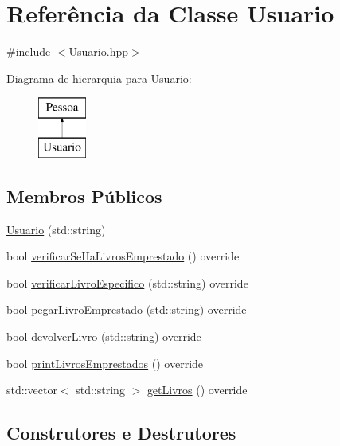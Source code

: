 \hypertarget{class_usuario}{}\section{Referência da Classe Usuario}
\label{class_usuario}


{\ttfamily \#include $<$Usuario.\+hpp$>$}

Diagrama de hierarquia para Usuario\+:\begin{figure}[H]
\begin{center}
\leavevmode
\includegraphics[height=2.000000cm]{class_usuario}
\end{center}
\end{figure}
\subsection*{Membros Públicos}
\begin{DoxyCompactItemize}
\item 
\mbox{\hyperlink{class_usuario_a1e70539cfa5991cd711aa808bf22426d}{Usuario}} (std\+::string)
\item 
bool \mbox{\hyperlink{class_usuario_a31278ae35c22cfd776023ac61fd7b936}{verificar\+Se\+Ha\+Livros\+Emprestado}} () override
\item 
bool \mbox{\hyperlink{class_usuario_a4924ca45ad5dfc728a1b42b5d796f276}{verificar\+Livro\+Especifico}} (std\+::string) override
\item 
bool \mbox{\hyperlink{class_usuario_a4466655ca0f573b8e46b2d62d16acb48}{pegar\+Livro\+Emprestado}} (std\+::string) override
\item 
bool \mbox{\hyperlink{class_usuario_ad1fe8d76ca93b5505e72b1b6d50acca5}{devolver\+Livro}} (std\+::string) override
\item 
bool \mbox{\hyperlink{class_usuario_ae654f1ccecd9db7278b891f72c13c025}{print\+Livros\+Emprestados}} () override
\item 
std\+::vector$<$ std\+::string $>$ \mbox{\hyperlink{class_usuario_ace50554a36f9deb7387bb2146295dedb}{get\+Livros}} () override
\end{DoxyCompactItemize}


\subsection{Construtores e Destrutores}
\mbox{\label{class_usuario_a1e70539cfa5991cd711aa808bf22426d}} 
